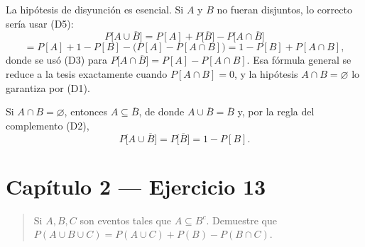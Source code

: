 \documentclass[11pt]{article}
\begin{document}
\begin{sol}
\begin{nota}
La hipótesis de disyunción es esencial. Si $A$ y $B$ no fueran disjuntos, lo correcto sería usar
(D5):
\[
P\big[A\cup\overline{B}\big]=P[A]+P\big[\overline{B}\big]-P\big[A\cap\overline{B}\big]
\]
\[
=P[A]+1-P[B]-\big(P[A]-P[A\cap B]\big)=1-P[B]+P[A\cap B],
\]
donde se usó (D3) para $P\big[A\cap\overline{B}\big]=P[A]-P[A\cap B]$. Esa fórmula general se
reduce a la tesis exactamente cuando $P[A\cap B]=0$, y la hipótesis $A\cap B=\varnothing$ lo
garantiza por (D1).
\end{nota}

\end{sol}

\begin{resp}
Si $A\cap B=\varnothing$, entonces $A\subseteq\overline{B}$, de donde
$A\cup\overline{B}=\overline{B}$ y, por la regla del complemento (D2),
\[
\boxed{\;P\big[A\cup\overline{B}\big]=P\big[\overline{B}\big]=1-P[B].\;}
\]
\end{resp}

\section*{Capítulo 2 --- Ejercicio 13}

\begin{quote}
Si $A,B,C$ son eventos tales que $A\subseteq B^{c}$. Demuestre que
$P(A\cup B\cup C)=P(A\cup C)+P(B)-P(B\cap C)$.
\end{quote}
\end{document}

